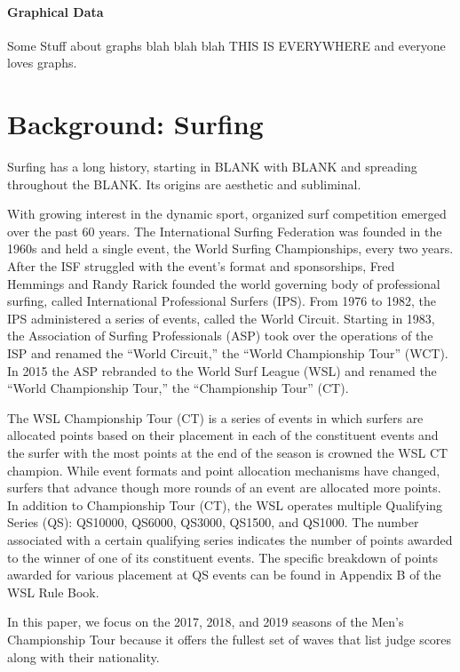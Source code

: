 \documentclass{article}
\theoremstyle{definition}
\begin{document}
\paragraph{Graphical Data} Some Stuff about graphs blah blah blah THIS IS EVERYWHERE and everyone loves graphs.

\section{Background: Surfing}
Surfing has a long history, starting in BLANK with BLANK and spreading throughout the BLANK. Its origins are aesthetic and subliminal.

With growing interest in the dynamic sport, organized surf competition emerged over the past 60 years. The International Surfing Federation was founded in the 1960s and held a single event, the World Surfing Championships, every two years. After the ISF struggled with the event’s format and sponsorships, Fred Hemmings and Randy Rarick founded the world governing body of professional surfing, called International Professional Surfers (IPS). From 1976 to 1982, the IPS administered a series of events, called the World Circuit. Starting in 1983, the Association of Surfing Professionals (ASP) took over the operations of the ISP and renamed the “World Circuit,” the “World Championship Tour” (WCT). In 2015 the ASP rebranded to the World Surf League (WSL) and renamed the “World Championship Tour,” the “Championship Tour” (CT).  

The WSL Championship Tour (CT) is a series of events in which surfers are allocated points based on their placement in each of the constituent events and the surfer with the most points at the end of the season is crowned the WSL CT champion. While event formats and point allocation mechanisms have changed, surfers that advance though more rounds of an event are allocated more points. In addition to Championship Tour (CT), the WSL operates multiple Qualifying Series (QS): QS10000, QS6000, QS3000, QS1500, and QS1000. The number associated with a certain qualifying series indicates the number of points awarded to the winner of one of its constituent events. The specific breakdown of points awarded for various placement at QS events can be found in Appendix B of the WSL Rule Book.

In this paper, we focus on the 2017, 2018, and 2019 seasons of the Men’s Championship Tour because it offers the fullest set of waves that list judge scores along with their nationality.
\end{document}
